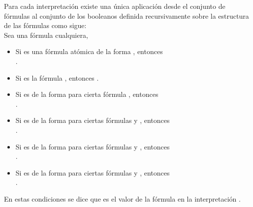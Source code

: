 \begin{isabellebody}
\begin{isamarkuptext}
  \begin{definicion}
  Para cada interpretación \isa{{\isasymA}} existe una única aplicación \isa{{\isasymI}\isactrlsub {\isasymA}} desde 
  el conjunto de fórmulas al conjunto \isa{{\isasymBB}} de los booleanos definida 
  recursivamente sobre la estructura de las fórmulas como sigue:\\
  Sea  una fórmula cualquiera,
    \begin{itemize}
      \item Si  es una fórmula atómica de la forma , entonces \\ 
        .
      \item Si  es la fórmula \isa{{\isasymbottom}}, entonces .
      \item Si  es de la forma  para cierta fórmula , 
        entonces\\ .
      \item Si  es de la forma  para ciertas fórmulas  y 
        , entonces\\ .
      \item Si  es de la forma  para ciertas fórmulas  y 
        , entonces\\ .
      \item Si  es de la forma  para ciertas fórmulas  y 
        , entonces\\ .
    \end{itemize}
  En estas condiciones se dice que  es el valor de la fórmula 
   en la interpretación \isa{{\isasymA}}.
  \end{definicion}


\end{isamarkuptext}
\end{isabellebody}
